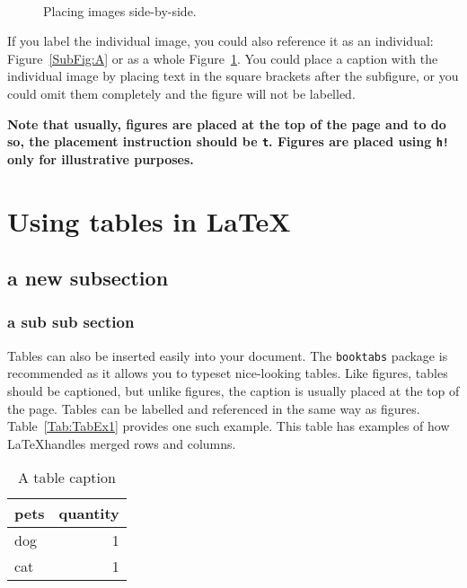\begin{figure}[h!]
  \centering
  \quad
  \\
  \caption[An example of two side-by-side images]{Placing images side-by-side.}\label{Fig:SideBySide}
\end{figure}



\noindent If you label the individual image, you could also reference it as an individual: Figure~\ref{SubFig:A} or as a whole Figure~\ref{Fig:SideBySide}.  You could place a caption with the individual image by placing text in the square brackets after the subfigure, or you could omit them completely and the figure will not be labelled.

\textbf{Note that usually, figures are placed at the top of the page and to do so, the placement instruction should be \texttt{t}. Figures are placed using \texttt{h!} only for illustrative purposes. }

\section{Using tables in \LaTeX}
\label{sec:label}
\subsection{a new subsection}
\subsubsection{a sub sub section}
Tables can also be inserted easily into your document. The \texttt{booktabs} package is recommended as it allows you to typeset nice-looking tables. Like figures, tables should be captioned, but unlike figures, the caption is usually placed at the top of the page. Tables can be labelled and referenced in the same way as figures. Table~\ref{Tab:TabEx1} provides one such example. This table has examples of how \LaTeX handles merged rows and columns.

\begin{table}
	\centering
	\caption{A table caption}
	\begin{tabular}{l  r} \toprule[2pt]
		
		pets & quantity\\ \midrule
		dog & 1\\
		cat & 1\\ \bottomrule[2pt]
	\end{tabular}	
	
\end{table}



